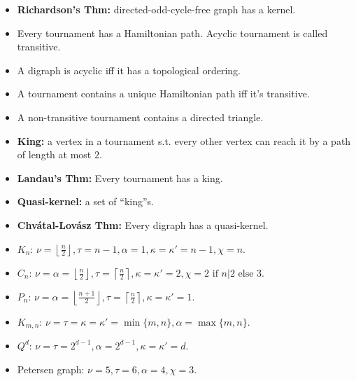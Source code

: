 \documentclass[10pt]{article}
\begin{document}
\begin{multicols*}{3}
\begin{itemize}
            \item \textbf{Richardson's Thm:} directed-odd-cycle-free graph has a kernel.
            \item Every tournament has a Hamiltonian path. Acyclic tournament is called transitive.
            \item A digraph is acyclic iff it has a topological ordering.
            \item A tournament contains a unique Hamiltonian path iff it's transitive.
            \item A non-transitive tournament contains a directed triangle.
            \item \textbf{King:} a vertex in a tournament s.t. every other vertex can reach it by a path of length at most $2$.
            \item \textbf{Landau's Thm:} Every tournament has a king.
            \item \textbf{Quasi-kernel:} a set of ``king''s.
            \item \textbf{Chv\'{a}tal-Lov\'{a}sz Thm:} Every digraph has a quasi-kernel.
            \item $K_n$: $\nu = \left\lfloor\frac{n}{2}\right\rfloor, \tau = n - 1, \alpha = 1, \kappa = \kappa' = n - 1, \chi = n$.
            \item $C_n$: $\nu = \alpha = \left\lfloor\frac{n}{2}\right\rfloor, \tau = \left\lceil\frac{n}{2}\right\rceil, \kappa = \kappa' = 2, \chi = 2 \textrm{ if } n | 2 \textrm{ else } 3$.
            \item $P_n$: $\nu = \alpha = \left\lfloor\frac{n + 1}{2}\right\rfloor, \tau = \left\lceil\frac{n}{2}\right\rceil, \kappa = \kappa' = 1$.
            \item $K_{m, n}$: $\nu = \tau = \kappa = \kappa' = \min\{m, n\}, \alpha = \max\{m, n\}$.
            \item $Q^d$: $\nu = \tau = 2^{d - 1}, \alpha = 2^{d - 1}, \kappa = \kappa' = d$.
            \item Petersen graph: $\nu = 5, \tau = 6, \alpha = 4, \chi = 3$.
        \end{itemize}
    \end{multicols*}
\end{document}
